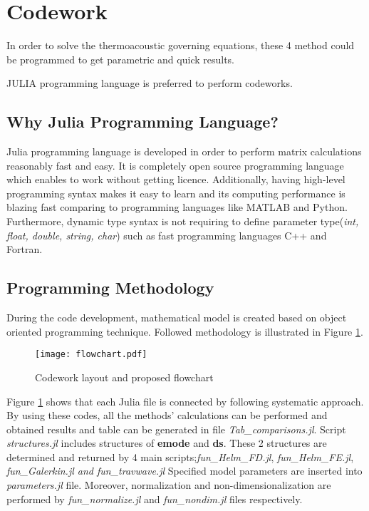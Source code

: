 \section{Codework}

In order to solve the thermoacoustic governing equations, these 4 method could be programmed to get parametric and quick results. 

JULIA programming language is preferred to perform codeworks.

\subsection{Why Julia Programming Language?}

Julia programming language is developed in order to perform matrix calculations reasonably fast and easy. It is completely open source programming language which enables to work without getting licence. Additionally, having high-level programming syntax makes it easy to learn and its computing performance is blazing fast comparing to programming languages like MATLAB and Python. Furthermore, dynamic type syntax is not requiring to define parameter type(\textit{int, float, double, string, char}) such as fast programming languages C++ and Fortran. 

\subsection{Programming Methodology}

During the code development, mathematical model is created based on object oriented programming technique. Followed methodology is illustrated in Figure \ref{fig:flowchart}. 

\FloatBarrier
\begin{figure}[!t]
	
	\texttt{[image: flowchart.pdf]}
	\caption{Codework layout and proposed flowchart}
	\label{fig:flowchart}
	
\end{figure}
\FloatBarrier

Figure \ref{fig:flowchart} shows that each Julia file is connected by following systematic approach. By using these codes, all the methods' calculations can be performed and obtained results and table can be generated in file \textit{Tab\_comparisons.jl}. Script \textit{structures.jl} includes structures of \textbf{emode} and \textbf{ds}. These 2 structures are determined and returned by 4 main scripts;\textit{fun\_Helm\_FD.jl}, \textit{fun\_Helm\_FE.jl}, \textit{fun\_Galerkin.jl and \textit{fun\_travwave.jl}} Specified model parameters are inserted into \textit{parameters.jl} file. Moreover, normalization and non-dimensionalization are performed by \textit{fun\_normalize.jl} and \textit{fun\_nondim.jl} files respectively.
